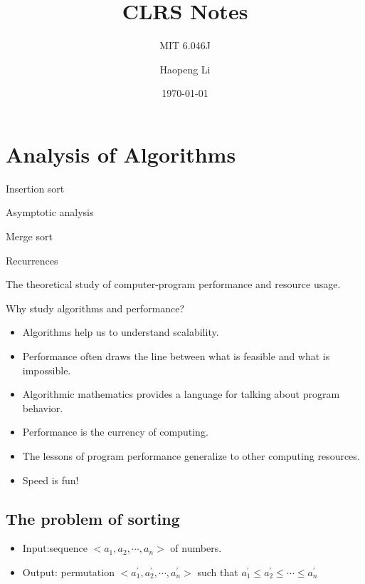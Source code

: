 \documentclass[11pt]{elegantbook}
\title{CLRS Notes}
\subtitle{MIT 6.046J}
\author{Haopeng Li}
\date{\today}
\begin{document}
\maketitle

\frontmatter
\tableofcontents

\mainmatter

\chapter{Analysis of Algorithms}
\begin{introduction}
  \item Insertion sort
  \item Asymptotic analysis
  \item Merge sort
  \item Recurrences
\end{introduction}
\begin{definition}[Algorithms]
  The theoretical study of computer-program performance and resource usage.
\end{definition}

\begin{note}
  Why study algorithms and performance?
  \begin{itemize}
    \item Algorithms help us to understand scalability.
    \item Performance often draws the line between what is feasible and what is impossible.
    \item Algorithmic mathematics provides a language for talking about program behavior.
    \item Performance is the currency of computing.
    \item The lessons of program performance generalize to other computing resources.
    \item Speed is fun!
  \end{itemize}
\end{note}
\section{The problem of sorting}
\begin{problem}
\begin{itemize}
  \item Input:sequence $<a_{1},a_{2},\cdots,a_{n}>$ of numbers.
  \item Output: permutation $<a_{1}^{\prime},a_2^{\prime},\cdots,a_{n}^{\prime}>$ such that $a_{1}^{\prime} \leq a_{2}^{\prime} \leq \cdots \leq a_{n}^{\prime}$
\end{itemize}
\end{problem}
\end{document}
